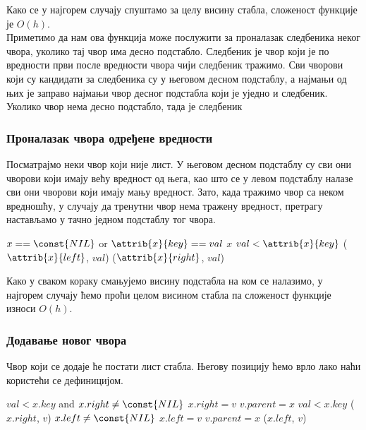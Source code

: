 \documentclass[11pt, a4paper]{article}
\theoremstyle{remark}
\numberwithin{equation}{section}
\begin{document}
	Како се у најгорем случају спуштамо за целу висину стабла, сложеност функције  је $O(h)$. \\
	
	\noindent Приметимо да нам ова функција може послужити за проналазак следбеника неког чвора, уколико тај чвор има десно подстабло. Следбеник је чвор који је по вредности први после вредности чвора чији следбеник тражимо. Сви чворови који су кандидати за следбеника су у његовом десном подстаблу, а најмањи од њих је заправо најмањи чвор десног подстабла који је уједно и следбеник. Уколико чвор нема десно подстабло, тада је следбеник
	
	\subsubsection{Проналазак чвора одређене вредности}
	Посматрајмо неки чвор који није лист. У његовом десном подстаблу су сви они чворови који имају већу вредност од њега, као што се у левом подстаблу налазе сви они чворови који имају мању вредност. Зато, када тражимо чвор са неком вредношћу, у случају да тренутни чвор нема тражену вредност, претрагу настављамо у тачно једном подстаблу тог чвора.
	
	\begin{codebox}
		\li \If $x == \const{NIL}$ or $\attrib{x}{key} == val$
		\li \Do \Return $x$
		\End
		\li \If $val < \attrib{x}{key}$
		\li \Do \Return {}($\attrib{x}{left}$, $val$)
		\End
		\li \Else \Return {}($\attrib{x}{right}$, $val$)
	\end{codebox}

	Како у сваком кораку смањујемо висину подстабла на ком се налазимо, у најгорем случају ћемо проћи целом висином стабла па сложеност функције  износи $O(h)$.
	
	\subsubsection{Додавање новог чвора}
	Чвор који се додаје ће постати лист стабла. Његову позицију ћемо врло лако наћи користећи се дефиницијом.
	
	\begin{codebox}
		\Procname {\proc{BST-Insert}($x$, $v$)}
		\li \If $val < x.key$ and $x.right \neq \const{NIL}$
		\li \Do $x.right=v$
		\li $v.parent=x$
		\End
		\li \Else \If $val < x.key$
		\li \Do {}($x.right$, $v$)
		\End
		\li \Else \If $x.left \neq \const{NIL}$
		\li \Do $x.left=v$
		\li $v.parent=x$
		\End
		\li \Else {}($x.left$, $v$)
	\end{codebox}
	
\end{document}
